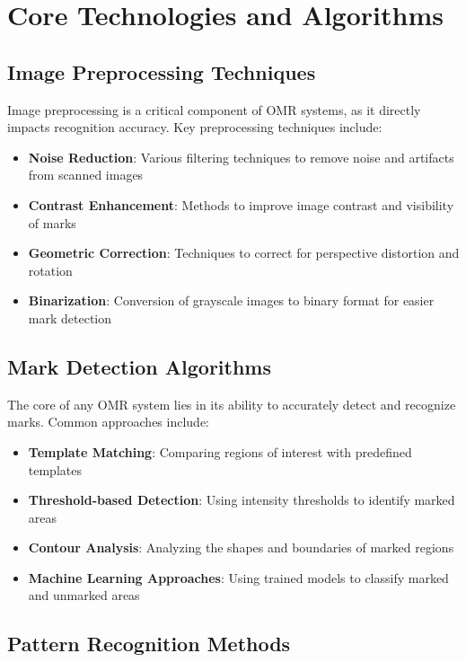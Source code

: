 \section{Core Technologies and Algorithms}

\subsection{Image Preprocessing Techniques}

Image preprocessing is a critical component of OMR systems, as it directly impacts recognition accuracy. Key preprocessing techniques include:

\begin{itemize}
\item \textbf{Noise Reduction}: Various filtering techniques to remove noise and artifacts from scanned images
\item \textbf{Contrast Enhancement}: Methods to improve image contrast and visibility of marks
\item \textbf{Geometric Correction}: Techniques to correct for perspective distortion and rotation
\item \textbf{Binarization}: Conversion of grayscale images to binary format for easier mark detection
\end{itemize}

\subsection{Mark Detection Algorithms}

The core of any OMR system lies in its ability to accurately detect and recognize marks. Common approaches include:

\begin{itemize}
\item \textbf{Template Matching}: Comparing regions of interest with predefined templates
\item \textbf{Threshold-based Detection}: Using intensity thresholds to identify marked areas
\item \textbf{Contour Analysis}: Analyzing the shapes and boundaries of marked regions
\item \textbf{Machine Learning Approaches}: Using trained models to classify marked and unmarked areas
\end{itemize}

\subsection{Pattern Recognition Methods}

